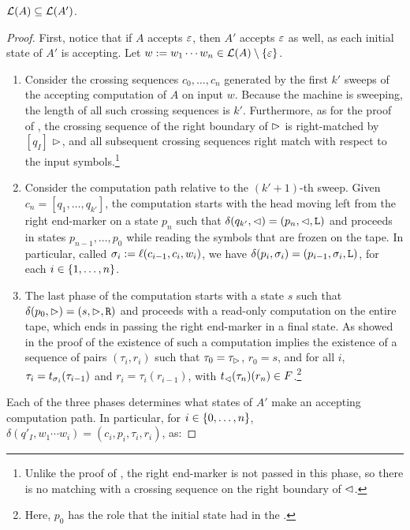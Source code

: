 \begin{lemm}\label{lem:swkLAtoNFA-1}
	$\mathcal L(A)\subseteq\mathcal L(A')$.
\end{lemm}
\begin{proof}
	First, notice that if $A$ accepts $\varepsilon$, then $A'$ accepts $\varepsilon$ as well, as each initial state of $A'$ is accepting.
	Let $w:=w_1\cdots w_n\in\mathcal L(A)\setminus\{\varepsilon\}$.
	\begin{enumerate}
		\item Consider the crossing sequences $c_0,\dots,c_n$ generated by the first $k'$ sweeps of the accepting computation of $A$ on input $w$.
		      Because the machine is sweeping, the length of all such crossing sequences is $k'$.
		      Furthermore, as for the proof of , the crossing sequence of the right boundary of $\rhd$ is right-matched by $[q_I]$ \wrt $\rhd$, and all subsequent crossing sequences right match with respect to the input symbols.\footnote{%
			      Unlike the proof of , the right end-marker is not passed in this phase, so there is no matching with a crossing sequence on the right boundary of $\lhd$.}
		\item Consider the computation path relative to the $(k'+1)$-th sweep.
		      Given $c_n=[q_1,\dots,q_{k'}]$, the computation starts with the head moving left from the right end-marker on a state $p_n$ such that $\delta(q_{k'},\lhd)=(p_n,\lhd,\mathtt L)$ and proceeds in states $p_{n-1},\dots,p_0$ while reading the symbols that are frozen on the tape.
		      In particular, called $\sigma_i:=\ell(c_{i-1},c_i,w_i)$, we have $\delta(p_i,\sigma_i)=(p_{i-1},\sigma_i,\mathtt L)$, for each $i\in\{1,\dots,n\}$.
		\item The last phase of the computation starts with a state $s$ such that $\delta(p_0,\rhd)=(s,\rhd,\mathtt R)$ and proceeds with a read-only computation on the entire tape, which ends in passing the right end-marker in a final state.
		      As showed in the proof of  the existence of such a computation implies the existence of a sequence of pairs $(\tau_i,r_i)$ such that $\tau_0=\tau_\rhd$, $r_0=s$, and for all $i$, $\tau_i=t_{\sigma_i}(\tau_{i-1})$ and $r_i=\tau_i(r_{i-1})$, with $t_\lhd(\tau_n)(r_n)\in F$.\footnote{%
			      Here, $p_0$ has the role that the initial state had in the \TDFA.}
	\end{enumerate}
	Each of the three phases determines what states of $A'$ make an accepting computation path. In particular, for $i\in\{0,\dots,n\}$, $\delta(q'_I,w_1\cdots w_i)=(c_i,p_i,\tau_i,r_i)$, as:

\end{proof}
